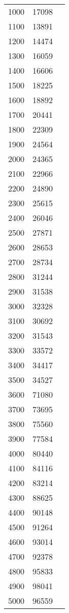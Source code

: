 \begin{figure}[H]
\begin{tabular}{r r r}
        1000 & 17098 \\
        1100 & 13891 \\
        1200 & 14474 \\
        1300 & 16059 \\
        1400 & 16606 \\
        1500 & 18225 \\
        1600 & 18892 \\
        1700 & 20441 \\
        1800 & 22309 \\
        1900 & 24564 \\
        2000 & 24365 \\
        2100 & 22966 \\
        2200 & 24890 \\
        2300 & 25615 \\
        2400 & 26046 \\
        2500 & 27871 \\
        2600 & 28653 \\
        2700 & 28734 \\
        2800 & 31244 \\
        2900 & 31538 \\
        3000 & 32328 \\
        3100 & 30692 \\
        3200 & 31543 \\
        3300 & 33572 \\
        3400 & 34417 \\
        3500 & 34527 \\
        3600 & 71080 \\
        3700 & 73695 \\
        3800 & 75560 \\
        3900 & 77584 \\
        4000 & 80440 \\
        4100 & 84116 \\
        4200 & 83214 \\
        4300 & 88625 \\
        4400 & 90148 \\
        4500 & 91264 \\
        4600 & 93014 \\
        4700 & 92378 \\
        4800 & 95833 \\
        4900 & 98041 \\
        5000 & 96559 \\

\end{tabular}
\end{figure}

